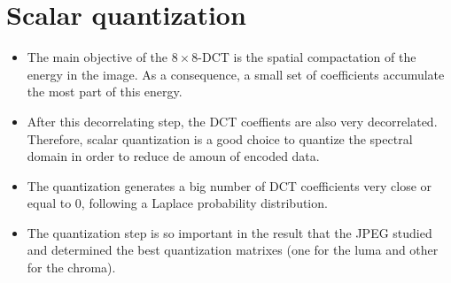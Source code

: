 \section{Scalar quantization}
\begin{itemize}
\item The main objective of the $8\times 8$-DCT is the spatial
  compactation of the energy in the image. As a consequence, a small
  set of coefficients accumulate the most part of this energy.
\item After this decorrelating step, the DCT coeffients are also very
  decorrelated. Therefore, scalar quantization is a good choice to
  quantize the spectral domain in order to reduce de amoun of encoded
  data.
\item The quantization generates a big number of DCT coefficients very
  close or equal to 0, following a Laplace probability distribution.
\item The quantization step is so important in the result that the
  JPEG studied and determined the best quantization matrixes (one for
  the luma and other for the chroma).
\end{itemize}
  \begin{center}
  \end{center}
